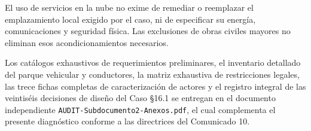 \vspace{0.4cm}
El uso de servicios en la nube no exime de remediar o reemplazar el emplazamiento local exigido por el caso, ni de especificar su energía, comunicaciones y seguridad física. Las exclusiones de obras civiles mayores no eliminan esos acondicionamientos necesarios.

\noindent Los catálogos exhaustivos de requerimientos preliminares, el inventario detallado del parque vehicular y conductores, la matriz exhaustiva de restricciones legales, las trece fichas completas de caracterización de actores y el registro integral de las veintiséis decisiones de diseño del Caso §16.1 se entregan en el documento independiente \texttt{AUDIT-Subdocumento2-Anexos.pdf}, el cual complementa el presente diagnóstico conforme a las directrices del Comunicado 10.

\nocite{bases-fep01, bases-fep02, bases-fep03, bases-com10, ley20123, codigo_trabajo_25bis, ley21719, ley21377, glec2023, iso14083, ds298, ds43minsal, ds158mop}
